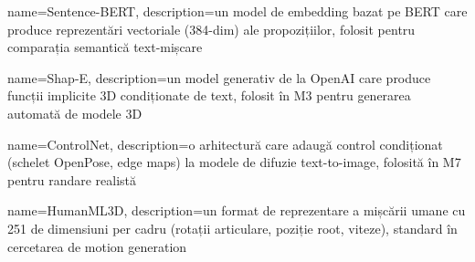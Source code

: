 {
  name=Sentence-BERT,
  description={un model de embedding bazat pe BERT care produce
               reprezentări vectoriale (384-dim) ale propozițiilor,
               folosit pentru comparația semantică text-mișcare}
}

{
  name=Shap-E,
  description={un model generativ de la OpenAI care produce funcții
               implicite 3D condiționate de text, folosit în M3 pentru
               generarea automată de modele 3D}
}

{
  name=ControlNet,
  description={o arhitectură care adaugă control condiționat
               (schelet OpenPose, edge maps) la modele de difuzie
               text-to-image, folosită în M7 pentru randare realistă}
}

{
  name=HumanML3D,
  description={un format de reprezentare a mișcării umane cu 251 de
               dimensiuni per cadru (rotații articulare, poziție root,
               viteze), standard în cercetarea de motion generation}
}
